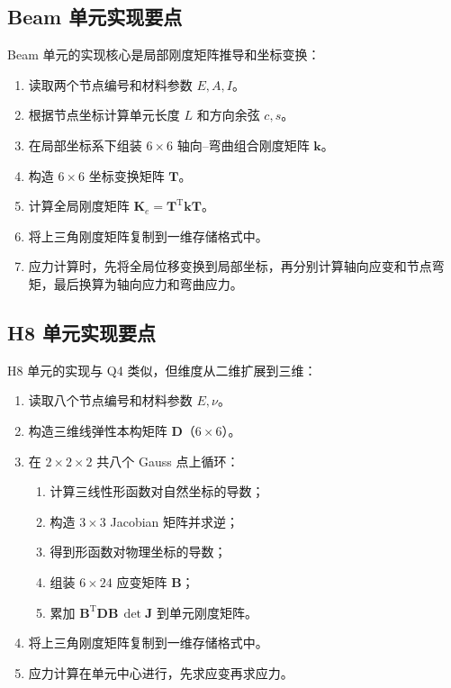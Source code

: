\documentclass[UTF8,a4paper,zihao=-4]{ctexart}
\newcommand{\T}{\mathrm{T}}
\newcommand{\Dmat}{\bm{D}}
\newcommand{\Bmat}{\bm{B}}
\newcommand{\Kmat}{\bm{K}}
\newcommand{\kmat}{\bm{k}}
\newcommand{\Tmat}{\bm{T}}
\begin{document}
\subsection{Beam 单元实现要点}

Beam 单元的实现核心是局部刚度矩阵推导和坐标变换：

\begin{enumerate}
    \item 读取两个节点编号和材料参数 $E,A,I$。
    \item 根据节点坐标计算单元长度 $L$ 和方向余弦 $c,s$。
    \item 在局部坐标系下组装 $6\times6$ 轴向--弯曲组合刚度矩阵 $\kmat$。
    \item 构造 $6\times6$ 坐标变换矩阵 $\Tmat$。
    \item 计算全局刚度矩阵 $\Kmat_e=\Tmat^{\T}\kmat\Tmat$。
    \item 将上三角刚度矩阵复制到一维存储格式中。
    \item 应力计算时，先将全局位移变换到局部坐标，再分别计算轴向应变和节点弯矩，最后换算为轴向应力和弯曲应力。
\end{enumerate}

\subsection{H8 单元实现要点}

H8 单元的实现与 Q4 类似，但维度从二维扩展到三维：

\begin{enumerate}
    \item 读取八个节点编号和材料参数 $E,\nu$。
    \item 构造三维线弹性本构矩阵 $\Dmat$（$6\times6$）。
    \item 在 $2\times2\times2$ 共八个 Gauss 点上循环：
    \begin{enumerate}
        \item 计算三线性形函数对自然坐标的导数；
        \item 构造 $3\times3$ Jacobian 矩阵并求逆；
        \item 得到形函数对物理坐标的导数；
        \item 组装 $6\times24$ 应变矩阵 $\Bmat$；
        \item 累加 $\Bmat^{\T}\Dmat\Bmat\,\det\bm{J}$ 到单元刚度矩阵。
    \end{enumerate}
    \item 将上三角刚度矩阵复制到一维存储格式中。
    \item 应力计算在单元中心进行，先求应变再求应力。
\end{enumerate}
\end{document}
